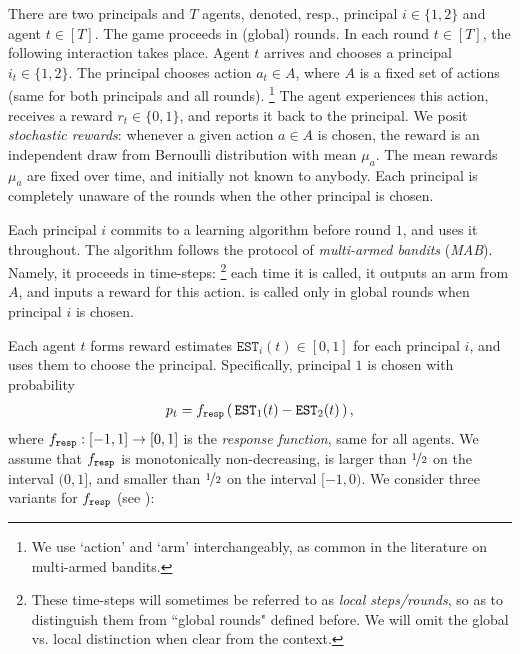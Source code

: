  There are two principals and $T$ agents,
denoted, resp., principal $i\in \{1,2\}$ and agent $t\in [T]$. The game proceeds in (global) rounds. In each round $t\in [T]$, the following  interaction takes place. Agent $t$ arrives and chooses a principal $i_t\in \{1,2\}$. The principal chooses action $a_t\in A$, where $A$ is a fixed set of actions (same for both principals and all rounds).%
\footnote{We use `action' and `arm' interchangeably, as common in the literature on multi-armed bandits.}
 The agent experiences this action, receives a reward $r_t\in \{ 0,1\}$, and reports it back to the principal. We posit \emph{stochastic rewards}: whenever a given action $a\in A$ is chosen, the reward is an independent draw from Bernoulli distribution with mean $\mu_a$. The mean rewards $\mu_a$ are fixed over time, and initially not known to anybody. Each principal is completely unaware of the rounds when the other principal is chosen.

Each principal $i$ commits to a learning algorithm \alg[i] before round $1$, and uses it throughout. The algorithm follows the protocol of \emph{multi-armed bandits} (\emph{MAB}). Namely, it proceeds in time-steps:%
\footnote{These time-steps will sometimes be referred to as \emph{local steps/rounds}, so as to distinguish them from ``global rounds" defined before. We will omit the global vs. local distinction when clear from the context.} each time it is called, it outputs an arm from $A$, and inputs a reward for this action. \alg[i] is called only in global rounds when principal $i$ is chosen.

\newcommand{\est}{\mathtt{EST}}


 Each agent $t$ forms reward estimates $\est_i(t)\in [0,1]$ for each principal $i$, and uses them to choose the principal. Specifically, principal $1$ is chosen with probability
\begin{align}\label{eq:model-f}
p_t = \respF\rbr{ \est_1(t) - \est_2(t) },
\end{align}
where $f_{\mathtt{resp}}:[-1,1]\to [0,1]$ is the \emph{response function}, same for all agents. We assume that $f_{\mathtt{resp}}$ is monotonically non-decreasing, is larger than $\nicefrac12$ on the interval $(0,1]$, and smaller than $\nicefrac12$ on the interval $[-1,0)$. We consider three variants for $f_{\mathtt{resp}}$ (see ):

